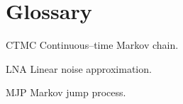 \chapter*{Glossary}      %
\thispagestyle{plain}
%
\begin{glossary}
\item[CTMC] Continuous--time Markov chain.
\item[LNA] Linear noise approximation.
\item[MJP] Markov jump process.
\end{glossary}